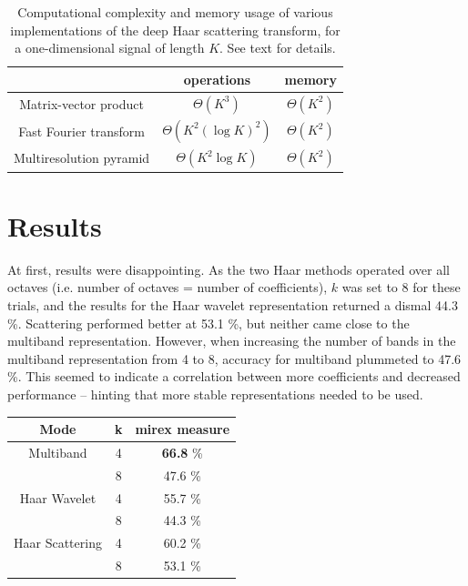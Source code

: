 \documentclass{article}
\begin{document}
\begin{table}
	\begin{center}
	\begin{tabular}{|c|cc|}
		\hline
		& operations & memory \\
		\hline
		Matrix-vector product & $\Theta(K^3)$ & $\Theta(K^2)$ \\
		Fast Fourier transform & $\Theta(K^2 (\log K)^2)$ & $\Theta(K^2)$ \\
		Multiresolution pyramid & $\Theta(K^2 \log K)$ & $\Theta(K^2)$ \\
		\hline		
	\end{tabular}
	\end{center}
	\caption{Computational complexity and memory usage of various implementations
	of the deep Haar scattering transform, for a one-dimensional signal
	of length $K$. See text for details.
	\label{table:scattering-complexities}}
\end{table}
	

\section{Results}\label{sec:results}

	At first, results were disappointing. As the two Haar methods operated over all octaves (i.e. number of octaves = number of coefficients), $k$ was set to 8 for these trials, and the results for the Haar wavelet representation returned a dismal 44.3 \%. Scattering performed better at 53.1 \%, but neither came close to the multiband representation.  However, when increasing the number of bands in the multiband representation from 4 to 8, accuracy for multiband plummeted to 47.6 \%. This seemed to indicate a correlation between more coefficients and decreased performance -- hinting that more stable representations needed to be used.
	
	\begin{center}
	\begin{tabular} {| c | c | c |}
	\hline
	Mode & k & \textsf{mirex} measure \\
	\hline
	Multiband & 4 & \textbf{66.8} \% \\
	& 8 & 47.6 \% \\
	
	Haar Wavelet & 4 & 55.7 \% \\
	 & 8 & 44.3 \% \\
	 
	 Haar Scattering & 4 & 60.2 \% \\
	  & 8 & 53.1 \% \\
	\hline
	\end{tabular}
	\end{center}
	
\end{document}
